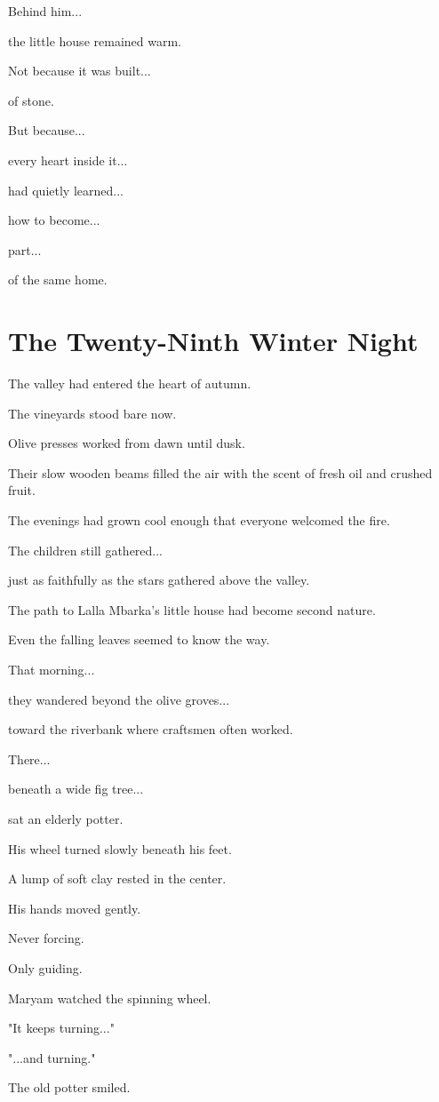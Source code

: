 \documentclass[12pt,openany]{book}
\begin{document}
Behind him...

the little house remained warm.

Not because it was built...

of stone.

But because...

every heart inside it...

had quietly learned...

how to become...

part...

of the same home.
\chapter{The Twenty-Ninth Winter Night}

The valley had entered the heart of autumn.

The vineyards stood bare now.

Olive presses worked from dawn until dusk.

Their slow wooden beams filled the air with the scent of fresh oil and crushed fruit.

The evenings had grown cool enough that everyone welcomed the fire.

The children still gathered...

just as faithfully as the stars gathered above the valley.

The path to Lalla Mbarka's little house had become second nature.

Even the falling leaves seemed to know the way.

That morning...

they wandered beyond the olive groves...

toward the riverbank where craftsmen often worked.

There...

beneath a wide fig tree...

sat an elderly potter.

His wheel turned slowly beneath his feet.

A lump of soft clay rested in the center.

His hands moved gently.

Never forcing.

Only guiding.

Maryam watched the spinning wheel.

"It keeps turning..."

"...and turning."

The old potter smiled.
\end{document}
